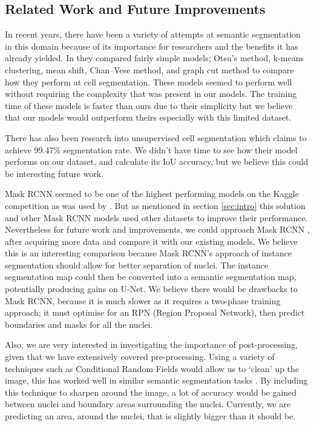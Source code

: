 \documentclass{article}
\begin{document}
\subsection{Related Work and Future Improvements}





In recent years, there have been a variety of attempts at semantic segmentation in this domain because of its importance for researchers and the benefits it has already yielded. In \cite{comparitivestudy} they compared fairly simple models; Otsu's method, k-means clustering, mean shift, Chan–Vese method, and graph cut method to compare how they perform at cell segmentation. These models seemed to perform well without requiring the complexity that was present in our models. The training time of these models is faster than ours due to their simplicity but we believe that our models would outperform theirs especially with this limited dataset.

There has also been research into unsupervised cell segmentation \cite{unsupervisedsegmentation} which claims to achieve 99.47\% segmentation rate. We didn't have time to see how their model performs on our dataset, and calculate its IoU accuracy, but we believe this could be interesting future work.

Mask RCNN seemed to be one of the highest performing models on the Kaggle competition as was used by \cite{kaggle11thplace}. But as mentioned in section \ref{sec:intro} this solution and other Mask RCNN models used other datasets to improve their performance. 
Nevertheless for future work and improvements, we could approach Mask RCNN \cite{MaskRCNN}, after acquiring more data and compare it with our existing models. We believe this is an interesting comparison because Mask RCNN's approach of instance segmentation should allow for better separation of nuclei. The instance segmentation map could then be converted into a semantic segmentation map, potentially producing gains on U-Net. We believe there would be drawbacks to Mask RCNN, because it is much slower as it requires a two-phase training approach; it must optimise for an RPN (Region Proposal Network), then predict boundaries and masks for all the nuclei.

Also, we are very interested in investigating the importance of post-processing, given that we have extensively covered pre-processing. Using a variety of techniques such as Conditional Random Fields would allow us to `clean' up the image, this has worked well in similar semantic segmentation tasks \cite{Shrestha2018ImprovedFC}. By including this technique to sharpen around the image, a lot of accuracy would be gained between nuclei and boundary areas surrounding the nuclei. Currently, we are predicting an area, around the nuclei, that is slightly bigger than it should be.



\end{document}
